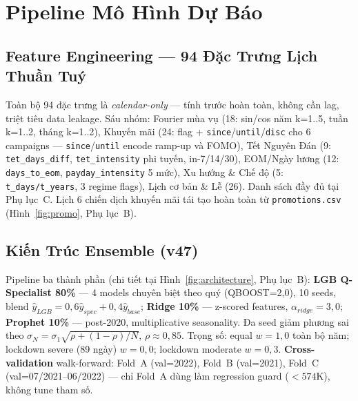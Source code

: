 \documentclass{article}
\begin{document}
\vspace{-4pt} %

\section{Pipeline Mô Hình Dự Báo}

\vspace{-2pt}
\subsection{Feature Engineering — 94 Đặc Trưng Lịch Thuần Tuý}
\vspace{-2pt}

Toàn bộ 94 đặc trưng là \textit{calendar-only} — tính trước hoàn toàn, không cần lag, triệt tiêu data leakage. Sáu nhóm: Fourier mùa vụ (18: sin/cos năm k=1..5, tuần k=1..2, tháng k=1..2), Khuyến mãi (24: flag + \texttt{since}/\texttt{until}/\texttt{disc} cho 6 campaigns — \texttt{since}/\texttt{until} encode ramp-up và FOMO), Tết Nguyên Đán (9: \texttt{tet\_days\_diff}, \texttt{tet\_intensity} phi tuyến, in-7/14/30), EOM/Ngày lương (12: \texttt{days\_to\_eom}, \texttt{payday\_intensity} 5 mức), Xu hướng \& Chế độ (5: \texttt{t\_days/t\_years}, 3 regime flags), Lịch cơ bản \& Lễ (26). Danh sách đầy đủ tại Phụ lục~C. Lịch 6 chiến dịch khuyến mãi tái tạo hoàn toàn từ \texttt{promotions.csv} (Hình~\ref{fig:promo}, Phụ lục~B).

\vspace{-2pt}
\subsection{Kiến Trúc Ensemble (v47)}
\vspace{-2pt}

Pipeline ba thành phần (chi tiết tại Hình~\ref{fig:architecture}, Phụ lục~B): \textbf{LGB Q-Specialist 80\%} — 4 models chuyên biệt theo quý (QBOOST=2,0), 10 seeds, blend $\hat{y}_{LGB}=0{,}6\hat{y}_{spec}+0{,}4\hat{y}_{base}$; \textbf{Ridge 10\%} — z-scored features, $\alpha_{ridge}=3{,}0$; \textbf{Prophet 10\%} — post-2020, multiplicative seasonality. Đa seed giảm phương sai theo $\sigma_N = \sigma_1\sqrt{\rho+(1-\rho)/N}$, $\rho\approx0{,}85$. Trọng số: equal $w=1{,}0$ toàn bộ năm; lockdown severe (89 ngày) $w=0{,}0$; lockdown moderate $w=0{,}3$. \textbf{Cross-validation} walk-forward: Fold~A (val=2022), Fold~B (val=2021), Fold~C (val=07/2021–06/2022) — chỉ Fold~A dùng làm regression guard ($<574$K), không tune tham số.
\end{document}
